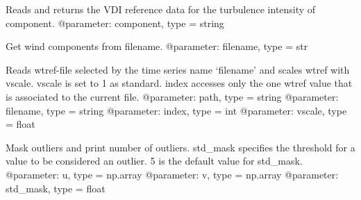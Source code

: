 \documentclass[letterpaper,10pt,english]{sphinxmanual}
\begin{document}

\begin{fulllineitems}
\label{\detokenize{index:windtunnel.get_turb_referencedata}}
Reads and returns the VDI reference data for the turbulence intensity of
component.
@parameter: component, type = string

\end{fulllineitems}


\begin{fulllineitems}
\label{\detokenize{index:windtunnel.get_wind_comps}}
Get wind components from filename.
@parameter: filename, type = str

\end{fulllineitems}


\begin{fulllineitems}
\label{\detokenize{index:windtunnel.get_wtref}}
Reads wtref-file selected by the time series name ‘filename’ and
scales wtref with vscale. vscale is set to 1 as standard. index 
accesses only the one wtref value that is associated to the current
file.
@parameter: path, type = string
@parameter: filename, type = string
@parameter: index, type = int
@parameter: vscale, type = float

\end{fulllineitems}


\begin{fulllineitems}
\label{\detokenize{index:windtunnel.mask_outliers}}
Mask outliers and print number of outliers. std\_mask specifies the
threshold for a value to be considered an outlier. 5 is the default 
value for std\_mask.
@parameter: u, type = np.array
@parameter: v, type = np.array
@parameter: std\_mask, type = float

\end{fulllineitems}
\end{document}
